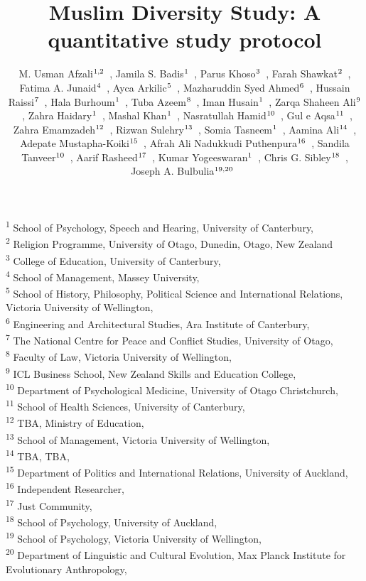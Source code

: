 \documentclass[
]{interact}
\title{Muslim Diversity Study: A quantitative study protocol}
\author{M. Usman
Afzali$\textsuperscript{1,2}$~\orcidlink{0000-0001-5119-9388}, Jamila S.
Badis$\textsuperscript{1}$~\orcidlink{0009-0005-2866-5033}, Parus
Khoso$\textsuperscript{3}$~\orcidlink{0000-0001-6384-038X}, Farah
Shawkat$\textsuperscript{2}$~\orcidlink{0000-0000-0000-0001}, Fatima A.
Junaid$\textsuperscript{4}$~\orcidlink{0000-0002-6656-8120}, Ayca
Arkilic$\textsuperscript{5}$~\orcidlink{0000-0002-1775-3311}, Mazharuddin
Syed Ahmed$\textsuperscript{6}$~\orcidlink{0000-0000-0000-0001}, Hussain
Raissi$\textsuperscript{7}$~\orcidlink{0009-0000-7985-1622}, Hala
Burhoum$\textsuperscript{1}$~\orcidlink{0000-0000-0000-0001}, Tuba
Azeem$\textsuperscript{8}$~\orcidlink{0000-0002-0611-8726}, Iman
Husain$\textsuperscript{1}$~\orcidlink{0000-0003-4032-4387}, Zarqa
Shaheen Ali$\textsuperscript{9}$~\orcidlink{0000-0002-7145-5788}, Zahra
Haidary$\textsuperscript{1}$~\orcidlink{0009-0000-5259-622X}, Mashal
Khan$\textsuperscript{1}$~\orcidlink{0000-0002-0000-0000}, Nasratullah
Hamid$\textsuperscript{10}$~\orcidlink{0009-0002-0120-7428}, Gul e
Aqsa$\textsuperscript{11}$~\orcidlink{0009-0003-0928-8039}, Zahra
Emamzadeh$\textsuperscript{12}$~\orcidlink{0000-0003-1776-3912}, Rizwan
Sulehry$\textsuperscript{13}$~\orcidlink{0000-0002-1209-0635}, Somia
Tasneem$\textsuperscript{1}$~\orcidlink{0000-0001-5471-6934}, Aamina
Ali$\textsuperscript{14}$~\orcidlink{0000-0002-0000-0000}, Adepate
Mustapha-Koiki$\textsuperscript{15}$~\orcidlink{0000-0003-4731-1781}, Afrah
Ali Nadukkudi
Puthenpura$\textsuperscript{16}$~\orcidlink{0000-0003-0000-0000}, Sandila
Tanveer$\textsuperscript{10}$~\orcidlink{0000-0002-0648-5382}, Aarif
Rasheed$\textsuperscript{17}$~\orcidlink{0000-0002-0000-0000}, Kumar
Yogeeswaran$\textsuperscript{1}$~\orcidlink{0000-0002-1978-5077}, Chris
G. Sibley$\textsuperscript{18}$~\orcidlink{0000-0002-4064-8800}, Joseph
A. Bulbulia$\textsuperscript{19,20}$~\orcidlink{0000-0002-5861-2056}}
\begin{document}
\captionsetup{labelsep=space}
\maketitle
\textsuperscript{1} School of Psychology, Speech and Hearing, University
of Canterbury,  \\ \textsuperscript{2} Religion Programme, University of
Otago, Dunedin, Otago, New Zealand\\ \textsuperscript{3} College of
Education, University of Canterbury,  \\ \textsuperscript{4} School of
Management, Massey University,  \\ \textsuperscript{5} School of
History, Philosophy, Political Science and International
Relations, Victoria University of
Wellington,  \\ \textsuperscript{6} Engineering and Architectural
Studies, Ara Institute of Canterbury,  \\ \textsuperscript{7} The
National Centre for Peace and Conflict Studies, University of
Otago,  \\ \textsuperscript{8} Faculty of Law, Victoria University of
Wellington,  \\ \textsuperscript{9} ICL Business School, New Zealand
Skills and Education College,  \\ \textsuperscript{10} Department of
Psychological Medicine, University of Otago
Christchurch,  \\ \textsuperscript{11} School of Health
Sciences, University of
Canterbury,  \\ \textsuperscript{12} TBA, Ministry of
Education,  \\ \textsuperscript{13} School of Management, Victoria
University of
Wellington,  \\ \textsuperscript{14} TBA, TBA,  \\ \textsuperscript{15} Department
of Politics and International Relations, University of
Auckland,  \\ \textsuperscript{16}  Independent
Researcher,  \\ \textsuperscript{17}  Just
Community,  \\ \textsuperscript{18} School of Psychology, University of
Auckland,  \\ \textsuperscript{19} School of Psychology, Victoria
University of Wellington,  \\ \textsuperscript{20} Department of
Linguistic and Cultural Evolution, Max Planck Institute for Evolutionary
Anthropology,  
\end{document}
